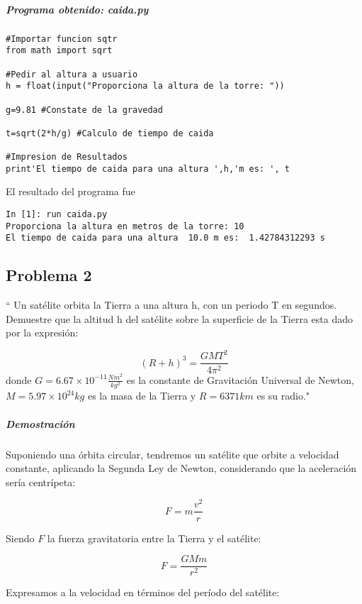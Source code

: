 \documentclass[12pt]{article}
\begin{document}
\subparagraph*{Programa obtenido: caida.py}
\begin{verbatim}
#Importar funcion sqtr
from math import sqrt

#Pedir al altura a usuario
h = float(input("Proporciona la altura de la torre: "))

g=9.81 #Constate de la gravedad

t=sqrt(2*h/g) #Calculo de tiempo de caida

#Impresion de Resultados
print'El tiempo de caida para una altura ',h,'m es: ', t 

\end{verbatim}
El resultado del programa fue
\begin{verbatim}
In [1]: run caida.py
Proporciona la altura en metros de la torre: 10
El tiempo de caida para una altura  10.0 m es:  1.42784312293 s
\end{verbatim}

\pagebreak
\subsection{Problema 2}

`` Un satélite orbita la Tierra a una altura h, con un periodo T en segundos.
Demuestre que la altitud h del satélite sobre la superficie de la Tierra esta dado por la expresión:

\begin{equation} \label{1}
(R+h)^3=\frac{GMT^2}{4\pi^2}
\end{equation}
donde $G = 6.67\times10^{-11} \frac{Nm^2}{kg^2} $ es la constante de Gravitación Universal de Newton, $M = 5.97 \times 10^{24} kg$ es la masa de la Tierra y $R=6371 km$ es su radio." \cite{act}

\subparagraph*{Demostración}
Suponiendo una órbita circular, tendremos un satélite que orbite a velocidad constante, aplicando la Segunda Ley de Newton, considerando que la aceleración sería centrípeta:

\begin{equation} \label{2}
F=m\frac{v^2}{r}
\end{equation}

Siendo $F$ la fuerza gravitatoria entre la Tierra y el satélite:

\begin{equation} \label{3}
F=\frac{GMm}{r^2}
\end{equation}

Expresamos a la velocidad en términos del período del satélite:
\end{document}
